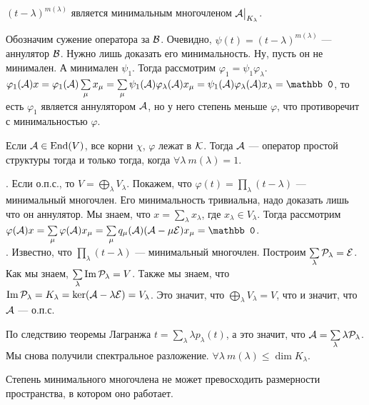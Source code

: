 \documentclass{article}
\DeclareMathOperator{\operIm}{Im}
\let\Im\operIm
\newcommand{\id}{{\mathcal{E}}}
\begin{document}
\begin{itemize}
\begin{Proof}
        \end{Proof}
        \thm $(t-\lambda)^{m(\lambda)}$ является минимальным многочленом ${\mathcal{A}}\big|_{K_\lambda}$.
        \begin{Proof}
            Обозначим сужение оператора за ${\mathcal{B}}$. Очевидно, $\psi(t)=(t-\lambda)^{m(\lambda)}$ --- аннулятор ${\mathcal{B}}$. Нужно лишь доказать его минимальность. Ну, пусть он не минимален. А минимален $\psi_1$. Тогда рассмотрим $\varphi_1=\psi_1\varphi_\lambda$. $\varphi_1(\scriptA)x=\varphi_1(\scriptA)\sum\limits_\mu x_\mu=\sum\limits_{\mu}\psi_1(\scriptA)\varphi_\lambda(\scriptA)x_\mu=\psi_1(\scriptA)\varphi_\lambda(\scriptA)x_\lambda=\mathbb0$, то есть $\varphi_1$ является аннулятором ${\mathcal{A}}$, но у него степень меньше $\varphi$, что противоречит с минимальностью $\varphi$.
        \end{Proof}
        \thm Если ${\mathcal{A}}\in\operatorname{End}(V)$, все корни $\chi$, $\varphi$ лежат в ${\mathcal{K}}$. Тогда ${\mathcal{A}}$ --- оператор простой структуры тогда и только тогда, когда $\forall\lambda~m(\lambda)=1$.
        \begin{Proof}
            \rightimp. Если о.п.с., то $V=\bigoplus\limits_\lambda V_\lambda$. Покажем, что $\varphi(t)=\prod\limits_{\lambda}(t-\lambda)$ --- минимальный многочлен. Его минимальность тривиальна, надо доказать лишь что он аннулятор. Мы знаем, что $x=\sum\limits_{\lambda}x_\lambda$, где $x_\lambda\in V_\lambda$. Тогда рассмотрим $\varphi(\scriptA)x=\sum\limits_{\mu}\varphi(\scriptA)x_\mu=\sum\limits_{\mu}q_\mu(\scriptA)(\scriptA-\mu\id)x_\mu=\mathbb0$.\\
            \leftimp. Известно, что $\prod\limits_\lambda(t-\lambda)$ --- минимальный многочлен. Построим $\sum\limits_{\lambda}\scriptP_\lambda=\id$. Как мы знаем, $\sum\limits_{\lambda}\Im\scriptP_\lambda=V$. Также мы знаем, что $\Im\scriptP_\lambda=K_\lambda=\ker(\scriptA-\lambda\id)=V_\lambda$. Это значит, что $\bigoplus\limits_{\lambda}V_\lambda=V$, что и значит, что ${\mathcal{A}}$ --- о.п.с.
        \end{Proof}
        \thm По следствию теоремы Лагранжа $t=\sum\limits_{\lambda}\lambda p_\lambda(t)$, а это значит, что ${\mathcal{A}}=\sum\limits_{\lambda}\lambda{\mathcal{P}}_\lambda$. Мы снова получили спектральное разложение.
        \thm $\forall\lambda~m(\lambda)\leqslant\dim K_\lambda$.
        \begin{Proof}
            Степень минимального многочлена не может превосходить размерности пространства, в котором оно работает.
        \end{Proof}
    \end{itemize}
\end{document}
